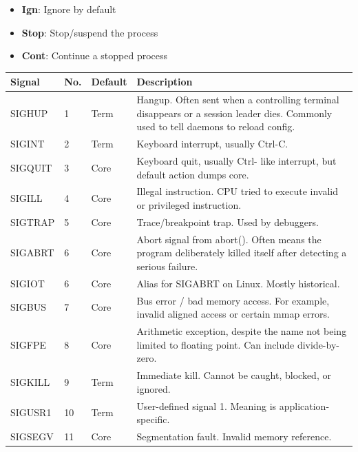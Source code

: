 \documentclass{report}
\begin{document}
\begin{itemize}
\begin{itemize}
                    \item \textbf{Ign}:	Ignore by default
                    \item \textbf{Stop}:	Stop/suspend the process
                    \item \textbf{Cont}:	Continue a stopped process
                \end{itemize}
                \begin{center}
                    \begin{tabularx}{\textwidth}{@{}lllX@{}}
                        \toprule
                        \textbf{Signal}&	\textbf{No.}&	\textbf{Default}&	\textbf{Description} \\
                        \midrule
                        SIGHUP	&1	&Term	&Hangup. Often sent when a controlling terminal disappears or a session leader dies. Commonly used to tell daemons to reload config.\\[2ex]
                        SIGINT	&2	&Term	&Keyboard interrupt, usually Ctrl-C.\\[2ex]
                        SIGQUIT	&3	&Core	&Keyboard quit, usually Ctrl-\; like interrupt, but default action dumps core.\\[2ex]
                        SIGILL	&4	&Core	&Illegal instruction. CPU tried to execute invalid or privileged instruction.\\[2ex]
                        SIGTRAP	&5	&Core	&Trace/breakpoint trap. Used by debuggers.\\[2ex]
                        SIGABRT	&6	&Core	&Abort signal from abort(). Often means the program deliberately killed itself after detecting a serious failure.\\[2ex]
                        SIGIOT	&6	&Core	&Alias for SIGABRT on Linux. Mostly historical.\\[2ex]
                        SIGBUS	&7	&Core	&Bus error / bad memory access. For example, invalid aligned access or certain mmap errors.\\[2ex]
                        SIGFPE	&8	&Core	&Arithmetic exception, despite the name not being limited to floating point. Can include divide-by-zero.\\[2ex]
                        SIGKILL	&9	&Term	&Immediate kill. Cannot be caught, blocked, or ignored.\\[2ex]
                        SIGUSR1	&10	&Term	&User-defined signal 1. Meaning is application-specific.\\[2ex]
                        SIGSEGV	&11	&Core	&Segmentation fault. Invalid memory reference.\\[2ex]

\end{tabularx}
\end{center}
\end{itemize}
\end{document}
